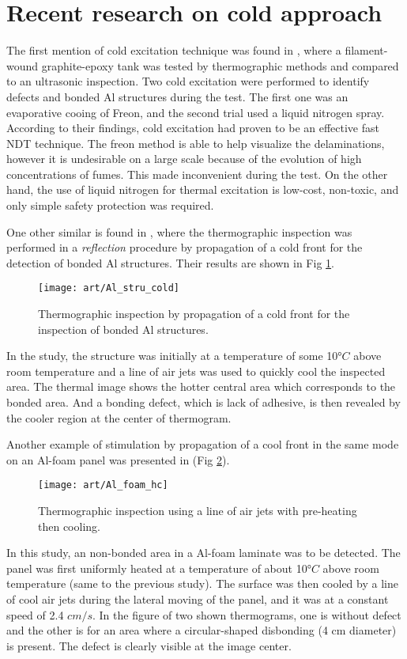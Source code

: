 \section{Recent research on cold approach}
The first mention of cold excitation technique was found in \citep{Burleigh1989Thermographic}, where a filament-wound graphite-epoxy tank was tested by thermographic methods and compared to an ultrasonic inspection. Two cold excitation were performed to identify defects and bonded Al structures during the test. The first one was an evaporative cooing of Freon, and the second trial used a liquid nitrogen spray. According to their findings, cold excitation had proven to be an effective fast NDT technique. The freon method is able to help visualize the delaminations, however it is undesirable on a large scale because of the evolution of high concentrations of fumes. This made inconvenient during the test. On the other hand, the use of liquid nitrogen for thermal excitation is low-cost, non-toxic, and only simple safety protection was required.


One other similar is found in \citep{Maldague1994bInfra}, where the thermographic inspection was performed in a \textit{reflection} procedure by propagation of a cold front for the detection of bonded Al structures. Their results are shown in Fig \ref{Al_stru_cold}. 
\begin{figure}[!htbp]
	\centering
	\texttt{[image: art/Al\_stru\_cold]}
	\caption{Thermographic inspection by propagation of a cold front for the inspection of bonded Al structures.}
	\label{Al_stru_cold}
\end{figure}
In the study, the structure was initially at a temperature of some 10$°C$ above room temperature and a line of air jets was used to quickly cool the inspected area. The thermal image shows the hotter central area which corresponds to the bonded area. And a bonding defect, which is lack of adhesive, is then revealed by the cooler region at the center of thermogram.

Another example of stimulation by propagation of a cool front in the same mode on an Al-foam panel was presented in \citep{Maldague1993Nondestructive}(Fig \ref{Al_foam_hc}).
\begin{figure}[!htbp]
	\centering
	\texttt{[image: art/Al\_foam\_hc]}
	\caption{Thermographic inspection using a line of air jets with pre-heating then cooling.}
	\label{Al_foam_hc}
\end{figure}
In this study, an non-bonded area in a Al-foam laminate was to be detected. The panel was first uniformly heated at a temperature of about 10$°C$ above room temperature (same to the previous study). The surface was then cooled by a line of cool air jets during the lateral moving of the panel, and it was at a constant speed of 2.4 $cm/s$. In the figure of two shown thermograms, one is without defect and the other is for an area where a circular-shaped disbonding (4 cm diameter) is present. The defect is clearly visible at the image center. 

